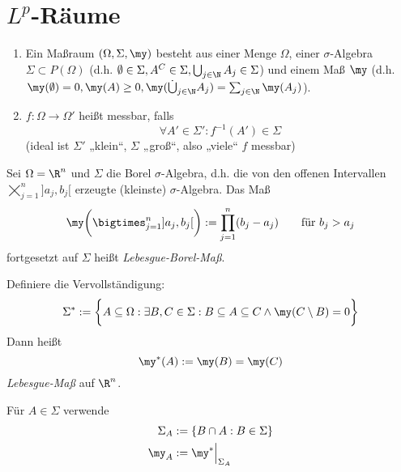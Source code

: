
\chapter{\texorpdfstring{$L^p$}{Lp}-Räume}


\begin{df} \label{2.1}
	\begin{enumerate}[1)]
		\item
			Ein Maßraum $(\Omega, \Sigma, \my)$ besteht aus einer Menge $\Omega$, einer $\sigma$-Algebra $\Sigma \subset P(\Omega)$ (d.h. $\emptyset \in \Sigma, A^C \in \Sigma, \bigcup_{j\in \N} A_j \in \Sigma$) und einem Maß $\my$ (d.h. $\my(\emptyset) = 0, \my(A) \ge 0, \my(\dot\bigcup_{j\in \N}A_j) = \sum_{j\in \N} \my(A_j)$).
		\item
			$f: \Omega \to \Omega'$ heißt messbar, falls
			\[
				\forall A' \in \Sigma' : f^{-1}(A') \in \Sigma
			\]
			(ideal ist $\Sigma'$ „klein“, $\Sigma$ „groß“, also „viele“ $f$ messbar)
	\end{enumerate}
\end{df}

\begin{ex}[Anwendung]
	Sei $\Omega = \R^n$ und $\Sigma$ die Borel $\sigma$-Algebra, d.h. die von den offenen Intervallen $\bigtimes_{j=1}^n ]a_j,b_j[$ erzeugte (kleinste) $\sigma$-Algebra.
	Das Maß
	\[
		\my \bigg( \bigtimes_{j=1}^n ]a_j,b_j[ \bigg) := \prod_{j=1}^n (b_j - a_j)
		\qquad \text{für $b_j > a_j$}
	\]
	fortgesetzt auf $\Sigma$ heißt \emph{Lebesgue-Borel-Maß}.

	Definiere die Vervollständigung:
	\[
		\Sigma^* := \bigg\{ A \subset \Omega : \exists B,C \in \Sigma : B \subset A \subset C \land \my(C \setminus B) = 0 \bigg\}
	\]
	Dann heißt
	\[
		\my^*(A) := \my(B) = \my(C)
	\]
	\emph{Lebesgue-Maß} auf $\R^n$.

	Für $A \in \Sigma$ verwende
	\begin{align*}
		\Sigma_A &:= \{ B \cap A : B \in \Sigma \} \\
		\my_A &:= \my^* \Big|_{\Sigma_A}
	\end{align*}
\end{ex}

